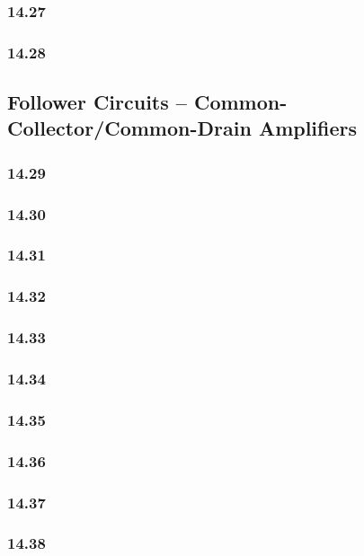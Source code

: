 \documentclass[11pt,a4paper,titlepage]{article}
\begin{document}
\subsubsection*{14.27}

\subsubsection*{14.28}

\subsection{Follower Circuits – Common-Collector/Common-Drain Amplifiers}

\subsubsection*{14.29}

\subsubsection*{14.30}

\subsubsection*{14.31}

\subsubsection*{14.32}

\subsubsection*{14.33}

\subsubsection*{14.34}

\subsubsection*{14.35}

\subsubsection*{14.36}

\subsubsection*{14.37}

\subsubsection*{14.38}
\end{document}
